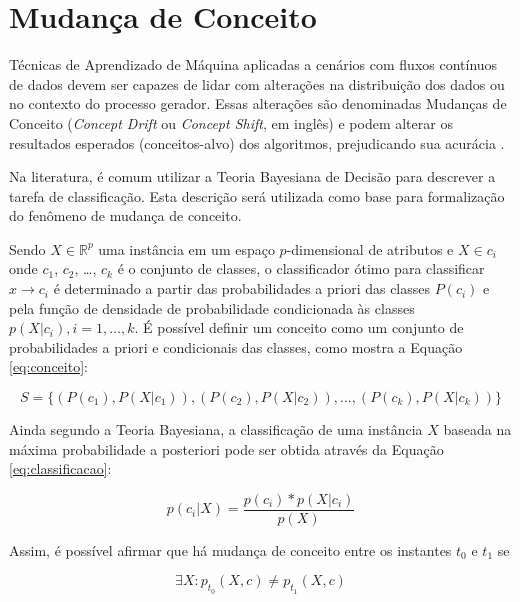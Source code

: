 \documentclass[msc, classic, a4paper]{ufbathesis}
\begin{document}
\section{Mudança de Conceito}
\label{sec:mudanca_de_conceito}

Técnicas de Aprendizado de Máquina aplicadas a cenários com fluxos contínuos de dados devem ser capazes de lidar com alterações na distribuição dos dados ou no contexto do processo gerador.
Essas alterações são denominadas Mudanças de Conceito (\textit{Concept Drift} ou \textit{Concept Shift}, em inglês) e podem alterar os resultados esperados (conceitos-alvo) dos algoritmos, prejudicando sua acurácia \cite{Widmer:1996:LPC:226791.226798}.

Na literatura, é comum utilizar a Teoria Bayesiana de Decisão \cite{Duda:2000:PC:954544} para descrever a tarefa de classificação.
Esta descrição será utilizada como base para formalização do fenômeno de mudança de conceito.

Sendo $X \in \mathbb{R}^p$ uma instância em um espaço $p$-dimensional de atributos e $X \in c_i$ onde $c_1$, $c_2$, \ldots, $c_k$ é o conjunto de classes,
o classificador ótimo para classificar $x \rightarrow c_i$ é determinado a partir das probabilidades a priori das classes $P(c_i)$ e pela função de densidade de probabilidade condicionada às classes $p(X|c_i), i = 1, \ldots, k$.
É possível definir um conceito como um conjunto de probabilidades a priori e condicionais das classes, como mostra a Equação \ref{eq:conceito}:

\begin{equation} \label{eq:conceito}
    S = \{(P(c_1), P(X|c_1)), (P(c_2), P(X|c_2)), ..., (P(c_k), P(X|c_k))\}
\end{equation}

Ainda segundo a Teoria Bayesiana, a classificação de uma instância $X$ baseada na máxima probabilidade a posteriori pode ser obtida através da Equação \ref{eq:classificacao}:

\begin{equation} \label{eq:classificacao}
    p(c_i|X) = \frac{p(c_i) * p(X|c_i)}{p(X)}
\end{equation}

Assim, é possível afirmar que há mudança de conceito entre os instantes $t_0$ e $t_1$ se

\begin{equation} \label{eq:3}
    {\exists}X : p_{t_0}(X, c) \ne p_{t_1}(X, c)
\end{equation}
\end{document}
